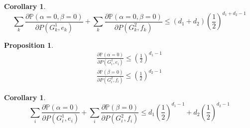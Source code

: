 \documentclass[a4paper]{article}
\newtheorem{Cor}[Thm]{Corollary}
\newtheorem{Prop}[Thm]{Proposition}
\begin{document}
	\begin{Cor}
		\[\sum_k \frac{\partial \mathbb{P}\left( \alpha = 0, \beta = 0 \right) }{ \partial P(G_k^1, e_k) } + \sum_k \frac{\partial \mathbb{P}\left( \alpha = 0, \beta = 0 \right) }{ \partial P(G_k^2, f_k) } \leq (d_1 + d_2) (\frac{1}{2})^{d_1+d_2-1}\]
	\end{Cor}

	\begin{Prop}
		\begin{align*}
			\frac{\partial \mathbb{P}\left( \alpha = 0 \right) }{ \partial P(G_i^1, e_i) } \leq (\frac{1}{2})^{d_1 -1} \\
			\frac{\partial \mathbb{P}\left( \beta = 0 \right) }{ \partial P(G_i^2, f_i) } \leq (\frac{1}{2})^{d_2 -1} 
		\end{align*}
	\end{Prop}

	\begin{Cor}
		\[ 
			\sum_i \frac{\partial \mathbb{P}\left( \alpha = 0 \right) }{ \partial P(G_i^1, e_i) } +
			\sum_i \frac{\partial \mathbb{P}\left( \beta = 0 \right) }{ \partial P(G_i^2, f_i) } \leq d_1 \left( \frac{1}{2} \right)^{d_1-1} +d_2 \left( \frac{1}{2} \right)^{d_2-1}
		\]
	\end{Cor}
\end{document}
